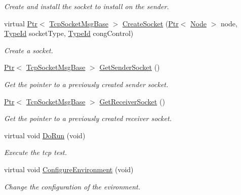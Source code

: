 \begin{DoxyCompactItemize}
\begin{DoxyCompactList}\small\item\em Create and install the socket to install on the sender. \end{DoxyCompactList}\item 
virtual \hyperlink{classns3_1_1Ptr}{Ptr}$<$ \hyperlink{classns3_1_1TcpSocketMsgBase}{Tcp\+Socket\+Msg\+Base} $>$ \hyperlink{classns3_1_1TcpGeneralTest_a6db100da714de812ebab9756f9139c9a}{Create\+Socket} (\hyperlink{classns3_1_1Ptr}{Ptr}$<$ \hyperlink{classns3_1_1Node}{Node} $>$ node, \hyperlink{classns3_1_1TypeId}{Type\+Id} socket\+Type, \hyperlink{classns3_1_1TypeId}{Type\+Id} cong\+Control)
\begin{DoxyCompactList}\small\item\em Create a socket. \end{DoxyCompactList}\item 
\hyperlink{classns3_1_1Ptr}{Ptr}$<$ \hyperlink{classns3_1_1TcpSocketMsgBase}{Tcp\+Socket\+Msg\+Base} $>$ \hyperlink{classns3_1_1TcpGeneralTest_ae6a29b683f684bc452b14dc52834a3a9}{Get\+Sender\+Socket} ()
\begin{DoxyCompactList}\small\item\em Get the pointer to a previously created sender socket. \end{DoxyCompactList}\item 
\hyperlink{classns3_1_1Ptr}{Ptr}$<$ \hyperlink{classns3_1_1TcpSocketMsgBase}{Tcp\+Socket\+Msg\+Base} $>$ \hyperlink{classns3_1_1TcpGeneralTest_a04dbce4c3ee58e1f88946cabef4076dc}{Get\+Receiver\+Socket} ()
\begin{DoxyCompactList}\small\item\em Get the pointer to a previously created receiver socket. \end{DoxyCompactList}\item 
virtual void \hyperlink{classns3_1_1TcpGeneralTest_a79f00453e60b95fcf8d22757593f5ed3}{Do\+Run} (void)
\begin{DoxyCompactList}\small\item\em Execute the tcp test. \end{DoxyCompactList}\item 
virtual void \hyperlink{classns3_1_1TcpGeneralTest_abd4e42807a8d2b13dcd207131af12c3b}{Configure\+Environment} (void)
\begin{DoxyCompactList}\small\item\em Change the configuration of the evironment. \end{DoxyCompactList}\item 

\end{DoxyCompactItemize}
